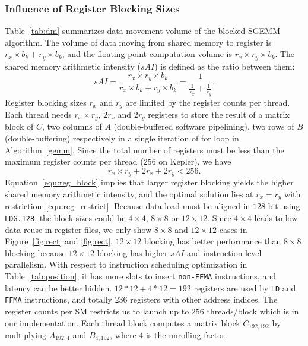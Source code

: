 \subsubsection{Influence of Register Blocking Sizes}
Table~\ref{tab:dm} summarizes data movement volume of the blocked SGEMM algorithm.
The volume of data moving from shared memory to register is $r_x\times b_k+ r_y\times b_k$, 
and the floating-point computation volume is $r_x\times r_y\times b_k$. 
The shared memory arithmetic intensity ($sAI$) is defined as the ratio between them:
{\small
\begin{equation}
sAI = \frac {r_x\times 
r_y\times b_k} {r_x\times b_k+ r_y\times b_k} = \frac{1}{\frac{1}{r_x} + \frac{1}{r_y}}.
    \label{equ:reg_block}
\end{equation}
}
Register blocking sizes $r_x$ and $r_y$ are limited by the register counts per thread. 
Each thread needs $r_x\times r_y$, $2r_x$ and $2r_y$ registers to store the result of a matrix block of $C$,  two columns of $A$ (double-buffered software pipelining),  two rows of $B$ (double-buffering) respectively in a single iteration of for loop in Algorithm~\ref{gemm}.
Since the total number of registers must be less than the maximum register counts per thread ($256$ on Kepler), we have
{\small
\begin{equation}
    r_x\times r_y + 2r_x + 2r_y < 256.
\label{equ:reg_restrict}
\end{equation}
}
Equation~\ref{equ:reg_block} implies that larger register blocking yields the higher shared memory arithmetic intensity,
and the optimal solution lies at $r_x=r_y$ with restriction~\ref{equ:reg_restrict}. 
Because data load must be aligned in $128$-bit using 
{\tt LDG.128}, the block sizes could be $4\times 4$, $8\times 8$ or $12\times 12$. 
Since $4\times 4$ leads to low data reuse in register files, we only show $8\times8$ and $12\times12$ cases in Figure~\ref{fig:rect} and \ref{fig:rect}.
$12\times12$ blocking has better performance than $8\times8$ blocking because $12\times12$ blocking has higher $sAI$ and instruction level parallelism. 
With respect to instruction scheduling optimization in Table~\ref{tab:position}, it has more slots to insert {\tt non-FFMA} instructions, and latency can be better hidden.
$12*12+4*12=192$ registers are used by {\tt LD} and {\tt FFMA} instructions, and totally $236$ registers with other address indices. 
The register counts per SM restricts us to launch up to $256$ threads/block which is in our implementation. 
Each thread block computes a matrix block $C_{192, 192}$ by multiplying $A_{192,4}$ and $B_{4, 192}$, where $4$ is the unrolling factor.

